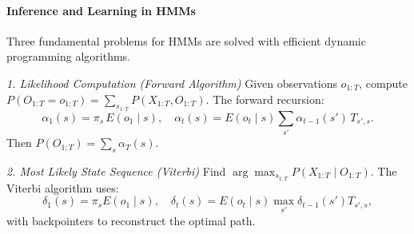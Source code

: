 \documentclass{tufte-handout}
\begin{document}
\begin{marginfigure}
\centering
\caption{Graphical model of an HMM: hidden states $X_t$ (circle) emit observations $O_t$ (square).}
\label{fig:hmm_graphical_model}
\end{marginfigure}

\paragraph{Inference and Learning in HMMs}
Three fundamental problems for HMMs are solved with efficient dynamic programming algorithms.

\emph{1. Likelihood Computation (Forward Algorithm)}
Given observations $o_{1:T}$, compute $P(O_{1:T}=o_{1:T}) = \sum_{s_{1:T}} P(X_{1:T}, O_{1:T})$. The forward recursion:
\[
\alpha_1(s) = \pi_s \, E(o_1 \mid s), \quad
\alpha_t(s) = E(o_t \mid s) \sum_{s'} \alpha_{t-1}(s') \, T_{s', s}.
\]
Then $P(O_{1:T}) = \sum_s \alpha_T(s)$.

\emph{2. Most Likely State Sequence (Viterbi)}
Find $\arg\max_{s_{1:T}} P(X_{1:T} \mid O_{1:T})$. The Viterbi algorithm uses:
\[
\delta_1(s) = \pi_s E(o_1 \mid s),\quad
\delta_t(s) = E(o_t \mid s) \max_{s'} \delta_{t-1}(s') T_{s', s},
\]
with backpointers to reconstruct the optimal path.
\end{document}
